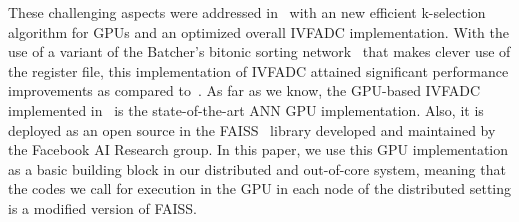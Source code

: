 These challenging aspects were addressed in~\cite{8733051} with an new efficient k-selection algorithm 
for GPUs and an optimized overall IVFADC implementation. With the use of a variant of the Batcher's bitonic 
sorting network~\cite{batcher1968sorting} that makes clever use of the register file, this implementation
of IVFADC attained significant performance improvements as compared to~\cite{7780592}. As 
far as we know, the GPU-based IVFADC implemented in~\cite{8733051} is the state-of-the-art ANN GPU 
implementation. Also, it is deployed as an open source in the FAISS~\cite{faiss} library developed and
maintained by the Facebook AI Research group. In this paper, we use this GPU implementation as a basic 
building block in our distributed and out-of-core system, meaning that the codes we call for execution
in the GPU in each node of the distributed setting is a modified version of FAISS.
